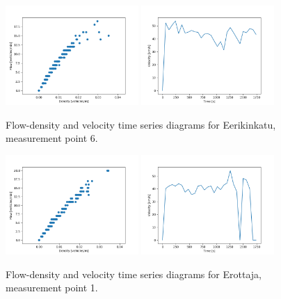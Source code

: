 \documentclass[english, 12pt, a4paper, elec, utf8, pdfa, online]{aaltothesis}
\begin{document}
\clearpage
\begin{figure}[ht!]
    \centering
    \includegraphics[width=0.45\textwidth]{graphs/Eerikinkatu_6_flw_dns.png}
    \includegraphics[width=0.45\textwidth]{graphs/Eerikinkatu_6_spd_time_6.png}
    \caption{Flow-density and velocity time series diagrams for Eerikinkatu, measurement point 6.}
\end{figure}
\begin{figure}[ht!]
    \centering
    \includegraphics[width=0.45\textwidth]{graphs/Erottaja_1_flw_dns.png}
    \includegraphics[width=0.45\textwidth]{graphs/Erottaja_1_spd_time_6.png}
    \caption{Flow-density and velocity time series diagrams for Erottaja, measurement point 1.}
\end{figure}
\end{document}
